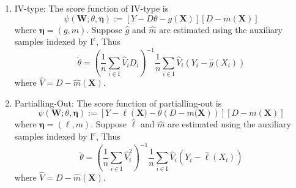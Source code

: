 \documentclass[en,mtpro2]{elegantpaper}
\begin{document}
\begin{enumerate}
    \item IV-type: The score function of IV-type is
          \begin{equation}
              \psi\left(\mathbf{W};\theta,\boldsymbol{\eta}\right):=\left[Y-D\theta-g(\mathbf{X})\right]\left[D-m(\mathbf{X})\right]
          \end{equation}
          where $\boldsymbol{\eta}=(g,m)$. Suppose $\hat{g}$ and $\hat{m}$ are estimated using the auxiliary samples indexed by $\mathrm{I}^{c}$, Thus
          \begin{equation}
              \check{\theta}=\left(\frac{1}{n}\sum_{i\in\mathrm{I}}\widehat{V}_{i}D_{i}\right)^{-1}\frac{1}{n}\sum_{i\in\mathrm{I}}\hat{V}_{i}\left(Y_{i}-\hat{g}\left(X_{i}\right)\right)
          \end{equation}
          where $\hat{V}=D-\hat{m}(\mathbf{X})$.
    \item Partialling-Out: The score function of partialling-out is
          \begin{equation}
              \psi\left(\mathbf{W};\theta,\boldsymbol{\eta}\right):=\left[Y-\ell\left(\mathbf{X})-\theta\left(D-m(\mathbf{X}\right)\right)\right]\left[D-m(\mathbf{X})\right]
          \end{equation}
          where $\boldsymbol{\eta}=(\ell,m)$. Suppose $\hat{\ell}$ and $\hat{m}$ are estimated using the auxiliary samples indexed by $\mathrm{I}^{c}$, Thus
          \begin{equation}
              \check{\theta}=\left(\frac{1}{n}\sum_{i\in\mathrm{I}}\widehat{V}_{i}^{2}\right)^{-1}\frac{1}{n}\sum_{i\in\mathrm{I}}\hat{V}_{i}\left(Y_{i}-\hat{\ell}\left(X_{i}\right)\right)
          \end{equation}
          where $\hat{V}=D-\hat{m}(\mathbf{X})$.
\end{enumerate}
\end{document}
